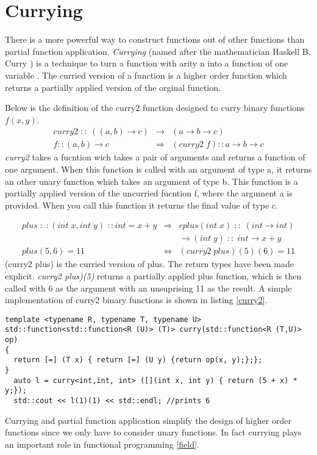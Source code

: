 \documentclass[12pt,fleqn]{article}
\begin{document}
\section*{Currying}

There is a more powerful way to construct functions out of other functions than partial function application.
{\em Currying} (named after the mathematician Haskell B. Curry ) is a technique to turn a function with arity n into a function of one variable \cite{field}.
The curried version of a function is a higher order function which returns a partially applied version of the orginal function.

Below is the definition of the curry2 function designed to curry binary functions $f(x,y)$.
\begin{eqnarray*}
curry2 \; :: \; ((a,b) \rightarrow c) &\rightarrow& (a \rightarrow b \rightarrow c) \\
f::(a,b) \rightarrow c &\Rightarrow&  (curry2\;f)::a \rightarrow b \rightarrow c 
\end{eqnarray*}
{\em curry2} takes a fucntion wich takes a pair of arguments and returns a function of one argument.
When this function is called with an argument of type a, it returns an other unary function which takes an argument of type b.
This function is a partially applied version of the uncurried fucntion f, where the argument a is provided.
When you call this function it returns the final value of type c.

\begin{eqnarray*}
plus\;:\;:(int \;x, int \;y) \;::int = x+y &\Rightarrow& cplus(int\; x) \;::\; (int \rightarrow int)  \\
                                                             & & \rightarrow (int \; y) \;::\; int \rightarrow x+y  \\
plus(5,6) = 11 &\Leftrightarrow&(curry2 \; plus)(5)(6) = 11
\end{eqnarray*}
(curry2 plus) is the curried version of plus.
The return types have been made explicit.
{\em curry2 plus)(5)} returns a partially applied plus function, which is then called with 6 as the argument with an unsuprising 11 as the result.
A simple implementation of curry2 binary functions is shown in listing \ref{curry2}.
\begin{lstlisting}[caption=curry for binary operators, label=curry2]
template <typename R, typename T, typename U>
std::function<std::function<R (U)> (T)> curry(std::function<R (T,U)> op)
{
  return [=] (T x) { return [=] (U y) {return op(x, y);};};
}
  auto l = curry<int,int, int> ([](int x, int y) { return (5 + x) * y;});
  std::cout << l(1)(1) << std::endl; //prints 6
\end{lstlisting}
Currying and partial function application simplify the design of higher order functions since we only have to consider unary functions.
In fact currying plays an important role in functional programming \ref{field}. 
\end{document}
